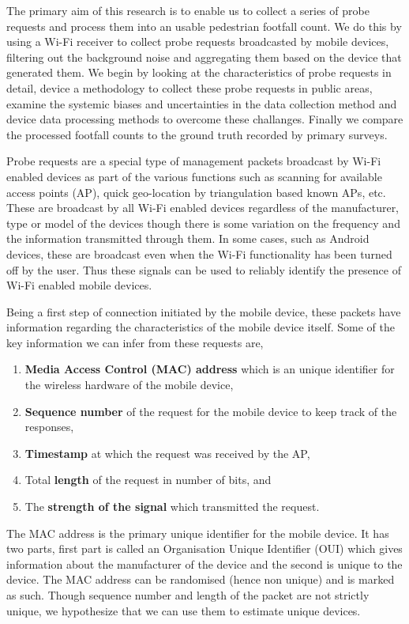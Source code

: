 The primary aim of this research is to enable us to collect a series of probe requests and process them into an usable pedestrian footfall count. 
We do this by using a Wi-Fi receiver to collect probe requests broadcasted by mobile devices, filtering out the background noise and aggregating them based on the device that generated them.
We begin by looking at the characteristics of probe requests in detail, device a methodology to collect these probe requests in public areas, examine the systemic biases and uncertainties in the data collection method and device data processing methods to overcome these challanges.
Finally we compare the processed footfall counts to the ground truth recorded by primary surveys.

Probe requests are a special type of management packets broadcast by Wi-Fi enabled devices as part of the various functions such as scanning for available access points (AP), quick geo-location by triangulation based known APs, etc.
These are broadcast by all Wi-Fi enabled devices regardless of the manufacturer, type or model of the devices though there is some variation on the frequency and the information transmitted through them.
In some cases, such as Android devices, these are broadcast even when the Wi-Fi functionality has been turned off by the user.
Thus these signals can be used to reliably identify the presence of Wi-Fi enabled mobile devices.

Being a first step of connection initiated by the mobile device, these packets have information regarding the characteristics of the mobile device itself. Some of the key information we can infer from these requests are,
\begin{enumerate}
	\item \textbf{Media Access Control (MAC) address} which is an unique identifier for the wireless hardware of the mobile device,
	\item \textbf{Sequence number} of the request for the mobile device to keep track of the responses,
	\item \textbf{Timestamp} at which the request was received by the AP,
	\item Total \textbf{length} of the request in number of bits, and 
	\item The \textbf{strength of the signal} which transmitted the request.
\end{enumerate}
The MAC address is the primary unique identifier for the mobile device.
It has two parts, first part is called an Organisation Unique Identifier (OUI) which gives information about the manufacturer of the device and the second is unique to the device. The MAC address can be randomised (hence non unique) and is marked as such. Though sequence number and length of the packet are not strictly unique, we hypothesize that we can use them to estimate unique devices.

